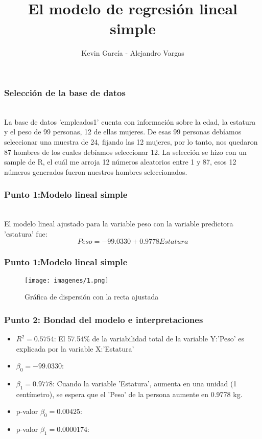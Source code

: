 \documentclass[12pt]{beamer}
\author{Kevin García - Alejandro Vargas}
\title{El modelo de regresión lineal simple}
\begin{document}
\begin{frame}
\titlepage
\end{frame}

\begin{frame}
\frametitle{Selección de la base de datos}
~\\La base de datos 'empleados1' cuenta con información sobre la edad, la estatura y el peso
de 99 personas, 12 de ellas mujeres. De esas 99 personas debíamos seleccionar una muestra de 24, fijando las 12 mujeres, por lo tanto, nos quedaron 87 hombres de los cuales debíamos seleccionar 12. La selección se hizo con un sample de R, el cuál me arroja 12 números aleatorios entre 1 y 87, esos 12 números generados fueron nuestros hombres seleccionados.
\end{frame}

\begin{frame}
\frametitle{Punto 1:Modelo lineal simple}
~\\ El modelo lineal ajustado para la variable peso con la variable predictora 'estatura' fue:
~\\ $$Peso=-99.0330+0.9778 Estatura$$
\end{frame}
\begin{frame}
\frametitle{Punto 1:Modelo lineal simple}
\begin{figure}[!h]
    \begin{center}
        \texttt{[image: imagenes/1.png]}
        \caption{Gráfica de dispersión con la recta ajustada}
        \label{fig:Densidad}
    \end{center}
\end{figure}
\end{frame}

\begin{frame}
\frametitle{Punto 2: Bondad del modelo e interpretaciones}
\begin{itemize}
\item $R^2=0.5754$: El 57.54\% de la variabilidad total de la variable Y:'Peso' es explicada por la variable X:'Estatura'
\item $\beta_{0}=-99.0330$:
\item $\beta_{1}=0.9778$: Cuando la variable 'Estatura', aumenta en una unidad (1 centímetro), se espera que el 'Peso' de la persona aumente en 0.9778 kg.
\item p-valor $\beta_{0}=0.00425$: 
\item p-valor $\beta_{1}=0.0000174$:
\end{itemize}
\end{frame}
\end{document}
